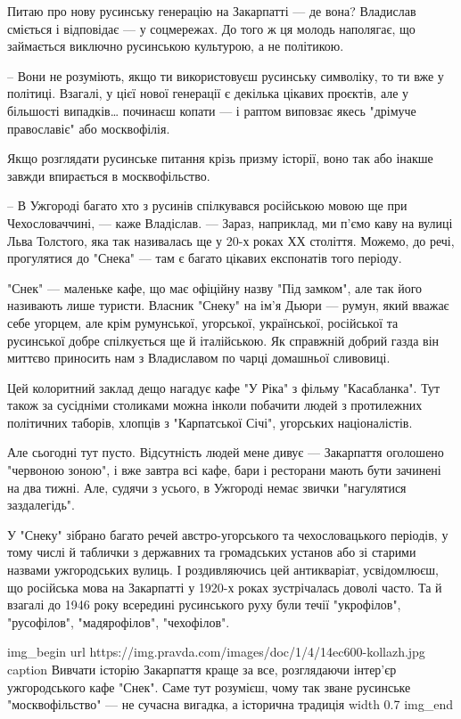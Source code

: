 Питаю про нову русинську генерацію на Закарпатті --- де вона? Владислав сміється
і відповідає --- у соцмережах. До того ж ця молодь наполягає, що займається
виключно русинською культурою, а не політикою.

– Вони не розуміють, якщо ти використовуєш русинську символіку, то ти вже у
політиці. Взагалі, у цієї нової генерації є декілька цікавих проєктів, але у
більшості випадків… починаєш копати --- і раптом виповзає якесь "дрімуче
православіє" або москвофілія.

Якщо розглядати русинське питання крізь призму історії, воно так або інакше
завжди впирається в москвофільство.

– В Ужгороді багато хто з русинів спілкувався російською мовою ще при
Чехословаччині, --- каже Владіслав. --- Зараз, наприклад, ми п’ємо каву на вулиці
Льва Толстого, яка так називалась ще у 20-х роках ХХ століття. Можемо, до речі,
прогулятися до "Снека" --- там є багато цікавих експонатів того періоду.

"Снек" --- маленьке кафе, що має офіційну назву "Під замком", але так його
називають лише туристи. Власник "Снеку" на ім’я Дьюри --- румун, який вважає себе
угорцем, але крім румунської, угорської, української, російської та русинської
добре спілкується ще й італійською. Як справжній добрий газда він миттєво
приносить нам з Владиславом по чарці домашньої сливовиці.

Цей колоритний заклад дещо нагадує кафе "У Ріка" з фільму "Касабланка". Тут
також за сусідніми столиками можна інколи побачити людей з протилежних
політичних таборів, хлопців з "Карпатської Січі", угорських націоналістів.

Але сьогодні тут пусто. Відсутність людей мене дивує --- Закарпаття оголошено
"червоною зоною", і вже завтра всі кафе, бари і ресторани мають бути зачинені
на два тижні. Але, судячи з усього, в Ужгороді немає звички "нагулятися
заздалегідь".

У "Снеку" зібрано багато речей австро-угорського та чехословацького періодів, у
тому числі й таблички з державних та громадських установ або зі старими назвами
ужгородських вулиць. І роздивляючись цей антикваріат, усвідомлюєш, що російська
мова на Закарпатті у 1920-х роках зустрічалась доволі часто. Та й взагалі до
1946 року всередині русинського руху були течії "укрофілов", "русофілов",
"мадярофілов", "чехофілов".

\ifcmt
img_begin 
        url https://img.pravda.com/images/doc/1/4/14ec600-kollazh.jpg
        caption Вивчати історію Закарпаття краще за все, розглядаючи інтер'єр ужгородського кафе "Снек". Саме тут розумієш, чому так зване русинське "москвофільство" --- не сучасна вигадка, а історична традиція
        width 0.7
img_end
\fi

